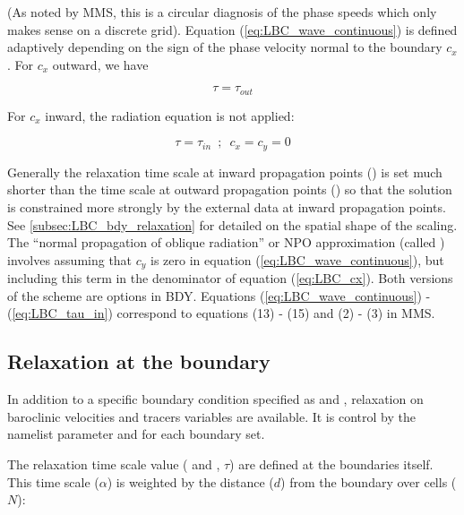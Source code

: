 \documentclass[../main/NEMO_manual]{subfiles}
\begin{document}
(As noted by MMS, this is a circular diagnosis of the phase speeds which only makes sense on a discrete grid).
Equation (\autoref{eq:LBC_wave_continuous}) is defined adaptively depending on the sign of the phase velocity normal to the boundary $c_x$.
For $c_x$ outward, we have

\begin{equation}
\tau = \tau_{out}
\end{equation}

For $c_x$ inward, the radiation equation is not applied:

\begin{equation}
  \label{eq:LBC_tau_in}
  \tau = \tau_{in}\,\,\,;\,\,\, c_x = c_y = 0
\end{equation}

Generally the relaxation time scale at inward propagation points () is set much shorter than the time scale at outward propagation
points () so that the solution is constrained more strongly by the external data at inward propagation points.
See \autoref{subsec:LBC_bdy_relaxation} for detailed on the spatial shape of the scaling.\\
The ``normal propagation of oblique radiation'' or NPO approximation (called ) involves assuming
that $c_y$ is zero in equation (\autoref{eq:LBC_wave_continuous}), but including
this term in the denominator of equation (\autoref{eq:LBC_cx}). Both versions of the scheme are options in BDY. Equations
(\autoref{eq:LBC_wave_continuous}) - (\autoref{eq:LBC_tau_in}) correspond to equations (13) - (15) and (2) - (3) in MMS.\\

\subsection{Relaxation at the boundary}
\label{subsec:LBC_bdy_relaxation}

In addition to a specific boundary condition specified as  and , relaxation on baroclinic velocities and tracers variables are available.
It is control by the namelist parameter  and  for each boundary set.

The relaxation time scale value ( and , $\tau$) are defined at the boundaries itself.
This time scale ($\alpha$) is weighted by the distance ($d$) from the boundary over  cells ($N$):
\end{document}
